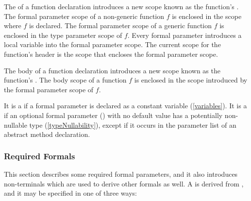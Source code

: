\documentclass[makeidx]{article}
\begin{document}

\LMHash{}%
The  of a function declaration introduces
a new scope known as the function's
.
The formal parameter scope of a non-generic function $f$ is enclosed in
the scope where $f$ is declared.
The formal parameter scope of a generic function $f$ is enclosed in
the type parameter scope of $f$.
Every formal parameter introduces a local variable into
the formal parameter scope.
The current scope for the function's header is
the scope that encloses the formal parameter scope.


\LMHash{}%
The body of a function declaration introduces
a new scope known as the function's
.
The body scope of a function $f$ is enclosed in the scope introduced by
the formal parameter scope of $f$.

\LMHash{}%
It is a  if a formal parameter
is declared as a constant variable (\ref{variables}).
It is a  if an optional formal parameter
()
with no default value has a potentially non-nullable type
(\ref{typeNullability}),
except if it occurs in the parameter list of an abstract method declaration.


\subsubsection{Required Formals}

\LMHash{}%
This section describes some required formal parameters,
and it also introduces non-terminals
which are used to derive other formals as well.
A  is derived from
,
and it may be specified in one of three ways:
\end{document}
